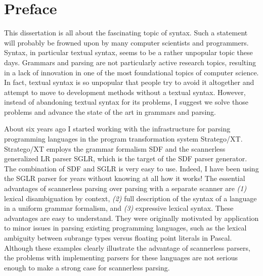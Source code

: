 \chapter*{Preface}
%

	This dissertation is all about the fascinating topic of
        syntax. Such a statement will probably be frowned upon by many
        computer scientists and programmers. Syntax, in particular
        textual syntax, seems to be a rather unpopular topic these
        days. Grammars and parsing are not particularly active
        research topics, resulting in a lack of innovation in one of
        the most foundational topics of computer science. In fact,
        textual syntax is so unpopular that people try to avoid it
        altogether and attempt to move to development methods without
        a textual syntax. However, instead of abandoning textual
        syntax for its problems, I suggest we solve those problems and
        advance the state of the art in grammars and parsing.

        About six years ago I started working with the infrastructure
        for parsing programming languages in the program
        transformation system Stratego/XT. Stratego/XT employs the
        grammar formalism SDF and the scannerless generalized LR
        parser SGLR, which is the target of the SDF parser
        generator. The combination of SDF and SGLR is very easy to
        use. Indeed, I have been using the SGLR parser for years
        without knowing at all how it works!
%
        The essential advantages of scannerless parsing over parsing
        with a separate scanner are \emph{(1)} lexical disambiguation
        by context, \emph{(2)} full description of the syntax of a
        language in a uniform grammar formalism, and \emph{(3)}
        expressive lexical syntax. These advantages are easy to
        understand.
%
        They were originally motivated by application to minor issues
        in parsing existing programming languages, such as the lexical
        ambiguity between subrange types versus floating point
        literals in Pascal. Although these examples clearly illustrate
        the advantage of scannerless parsers, the problems with
        implementing parsers for these languages are not serious
        enough to make a strong case for scannerless parsing.

